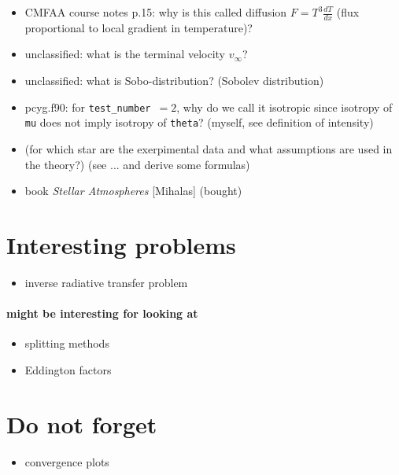 \documentclass[../main/main.tex]{subfiles}
\begin{document}
\begin{itemize}
\item CMFAA course notes p.15: why is this called diffusion $F=T^3 \frac{dT}{dx}$ (flux proportional to local gradient in temperature)?

\item unclassified: what is the terminal velocity $v_{\infty}$?

\item unclassified: what is Sobo-distribution? (Sobolev distribution)

\item pcyg.f90: for \texttt{test\_number $= 2$}, why do we call it isotropic since isotropy of \texttt{mu} does not imply isotropy of \texttt{theta}? (myself, see definition of intensity)

\item (for which star are the exerpimental data and what assumptions are used in the theory?) (see ... and derive some formulas)

\item book \textit{Stellar Atmospheres} [Mihalas] (bought)
\end{itemize}

\newpage
\section{Interesting problems}
\begin{itemize}
\item inverse radiative transfer problem
\end{itemize}

\paragraph{might be interesting for looking at}
\begin{itemize}
\item splitting methods
\item Eddington factors
\end{itemize}

\section{Do not forget}
\begin{itemize}
\item convergence plots
\end{itemize}
\end{document}
